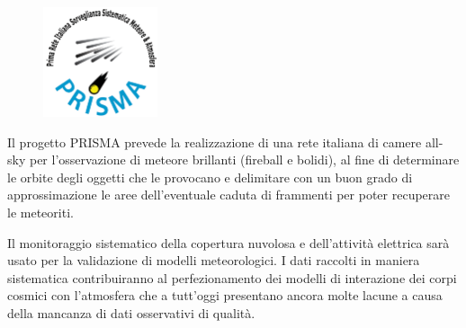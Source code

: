 \begin{figure}
    \vspace{-30pt}
    \begin{center}
    \includegraphics[width=0.3\textwidth]{images/logo.png}
    \end{center}
    \vspace{-22pt}
\end{figure}

Il progetto PRISMA prevede la realizzazione di una rete italiana di camere all-sky per l'osservazione di meteore brillanti (fireball e bolidi), al fine di determinare le orbite degli oggetti che le provocano e delimitare con un buon grado di approssimazione le aree dell'eventuale caduta di frammenti per poter recuperare le meteoriti.

Il monitoraggio sistematico della copertura nuvolosa e dell'attività elettrica sarà usato per la validazione di modelli meteorologici. I dati raccolti in maniera sistematica contribuiranno al perfezionamento dei modelli di interazione dei corpi cosmici con l'atmosfera che a tutt'oggi presentano ancora molte lacune a causa della mancanza di dati osservativi di qualità.
\cite{progetto-PRISMA}
